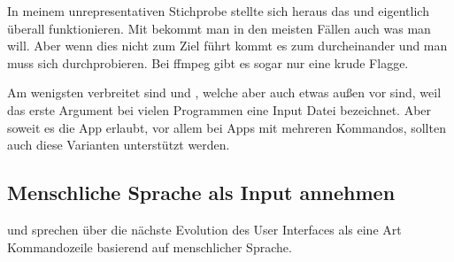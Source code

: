 \documentclass[oneside,bibliography=totocnumbered,BCOR=5mm]{scrbook}
\newenvironment{code}{\captionsetup{type=listing, skip=0pt}}{}
\begin{document}
In meinem unrepresentativen Stichprobe stellte sich heraus das
 und  eigentlich überall funktionieren. Mit
 bekommt man in den meisten Fällen auch was man will. Aber
wenn dies nicht zum Ziel führt kommt es zum durcheinander und man muss sich
durchprobieren. Bei ffmpeg gibt es sogar nur eine krude 
Flagge.

Am wenigsten verbreitet sind  und , welche
aber auch etwas außen vor sind, weil das erste Argument bei vielen Programmen
eine Input Datei bezeichnet. Aber soweit es die App erlaubt, vor allem bei Apps
mit mehreren Kommandos, sollten auch diese Varianten unterstützt werden.

%
%
%

\subsection{Menschliche Sprache als Input annehmen} %

\cite{Raskin_2008} und \cite{Norman_2007} sprechen über die nächste Evolution
des User Interfaces als eine Art Kommandozeile basierend auf menschlicher
Sprache.
\end{document}
